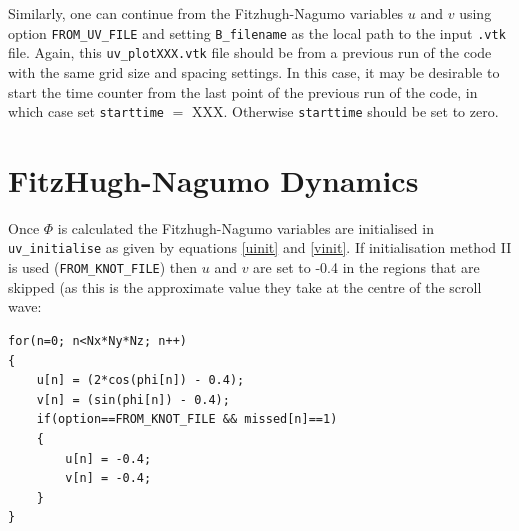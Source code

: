 \documentclass[notitlepage,aps,amsmath,amssymb,11pt]{revtex4-1}
\begin{document}
Similarly, one can continue from the Fitzhugh-Nagumo variables $u$ and $v$ using option \verb'FROM_UV_FILE' and setting \verb'B_filename' as the local path to the input \verb'.vtk' file. Again, this \verb'uv_plotXXX.vtk' file should be from a previous run of the code with the same grid size and spacing settings.  In this case, it may be desirable to start the time counter from the last point of the previous run of the code, in which case set \verb'starttime' $=$ XXX. Otherwise \verb'starttime' should be set to zero. 

\section{FitzHugh-Nagumo Dynamics}

Once $\Phi$ is calculated the Fitzhugh-Nagumo variables are initialised in \verb'uv_initialise' as given by equations \eqref{uinit} and \eqref{vinit}. If initialisation method II is used (\verb'FROM_KNOT_FILE') then $u$ and $v$ are set to -0.4 in the regions that are skipped (as this is the approximate value they take at the centre of the scroll wave:
\begin{verbatim}
for(n=0; n<Nx*Ny*Nz; n++)
{
    u[n] = (2*cos(phi[n]) - 0.4);
    v[n] = (sin(phi[n]) - 0.4);
    if(option==FROM_KNOT_FILE && missed[n]==1)
    {
        u[n] = -0.4;
        v[n] = -0.4;
    }
}
\end{verbatim}
\end{document}
